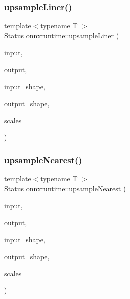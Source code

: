 \mbox{\label{namespaceonnxruntime_a176dc40b97b2f47e56a0f727fbc5a849}} 
\subsubsection{\texorpdfstring{upsample\+Liner()}{upsampleLiner()}}
{\footnotesize\ttfamily template$<$typename T $>$ \\
\mbox{\hyperlink{classonnxruntime_1_1common_1_1Status}{Status}} onnxruntime\+::upsample\+Liner (\begin{DoxyParamCaption}\item[{const T $\ast$}]{input,  }\item[{T $\ast$}]{output,  }\item[{const \mbox{\hyperlink{classonnxruntime_1_1TensorShape}{Tensor\+Shape}} \&}]{input\+\_\+shape,  }\item[{const \mbox{\hyperlink{classonnxruntime_1_1TensorShape}{Tensor\+Shape}} \&}]{output\+\_\+shape,  }\item[{const vector$<$ float $>$ \&}]{scales }\end{DoxyParamCaption})}

\mbox{\label{namespaceonnxruntime_ad5a07366f4beea1cdd18bc29c95aa42c}} 
\subsubsection{\texorpdfstring{upsample\+Nearest()}{upsampleNearest()}}
{\footnotesize\ttfamily template$<$typename T $>$ \\
\mbox{\hyperlink{classonnxruntime_1_1common_1_1Status}{Status}} onnxruntime\+::upsample\+Nearest (\begin{DoxyParamCaption}\item[{const T $\ast$}]{input,  }\item[{T $\ast$}]{output,  }\item[{const \mbox{\hyperlink{classonnxruntime_1_1TensorShape}{Tensor\+Shape}} \&}]{input\+\_\+shape,  }\item[{const \mbox{\hyperlink{classonnxruntime_1_1TensorShape}{Tensor\+Shape}} \&}]{output\+\_\+shape,  }\item[{const vector$<$ float $>$ \&}]{scales }\end{DoxyParamCaption})}

